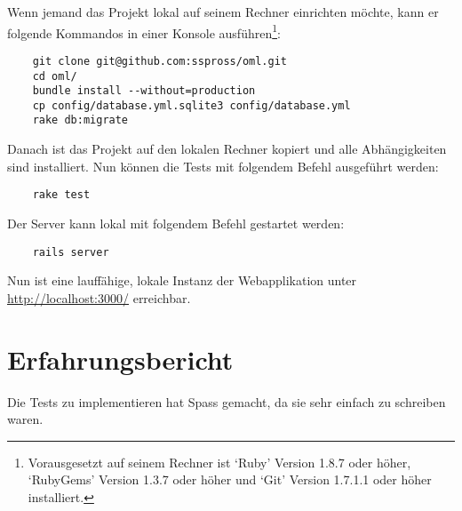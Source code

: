 Wenn jemand das Projekt lokal auf seinem Rechner einrichten möchte, kann er
folgende Kommandos in einer Konsole ausführen\footnote{Vorausgesetzt auf seinem
Rechner ist `Ruby' Version 1.8.7 oder höher, `RubyGems' Version 1.3.7 oder 
höher und `Git' Version 1.7.1.1 oder höher installiert.}:

\begin{verbatim}
    git clone git@github.com:sspross/oml.git
    cd oml/
    bundle install --without=production
    cp config/database.yml.sqlite3 config/database.yml
    rake db:migrate
\end{verbatim}

Danach ist das Projekt auf den lokalen Rechner kopiert und alle Abhängigkeiten
sind installiert. Nun können die Tests mit folgendem Befehl ausgeführt werden:

\begin{verbatim}
    rake test
\end{verbatim}

Der Server kann lokal mit folgendem Befehl gestartet werden:

\begin{verbatim}
    rails server
\end{verbatim}

Nun ist eine lauffähige, lokale Instanz der Webapplikation unter 
\url{http://localhost:3000/} erreichbar.  

\section{Erfahrungsbericht}
Die Tests zu implementieren hat Spass gemacht, da sie sehr einfach zu schreiben
waren.